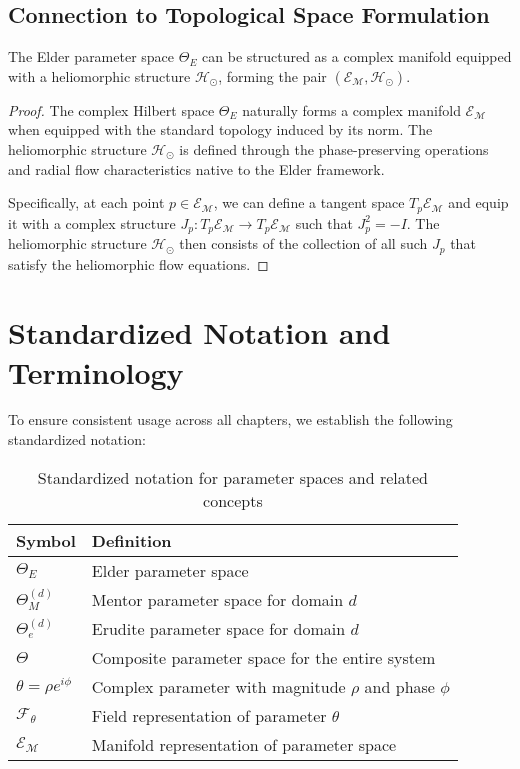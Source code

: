\subsection{Connection to Topological Space Formulation}

\begin{theorem}
The Elder parameter space $\Theta_E$ can be structured as a complex manifold equipped with a heliomorphic structure $\mathcal{H}_{\odot}$, forming the pair $(\mathcal{E}_{\mathcal{M}}, \mathcal{H}_{\odot})$.
\end{theorem}

\begin{proof}
The complex Hilbert space $\Theta_E$ naturally forms a complex manifold $\mathcal{E}_{\mathcal{M}}$ when equipped with the standard topology induced by its norm. The heliomorphic structure $\mathcal{H}_{\odot}$ is defined through the phase-preserving operations and radial flow characteristics native to the Elder framework.

Specifically, at each point $p \in \mathcal{E}_{\mathcal{M}}$, we can define a tangent space $T_p\mathcal{E}_{\mathcal{M}}$ and equip it with a complex structure $J_p: T_p\mathcal{E}_{\mathcal{M}} \to T_p\mathcal{E}_{\mathcal{M}}$ such that $J_p^2 = -I$. The heliomorphic structure $\mathcal{H}_{\odot}$ then consists of the collection of all such $J_p$ that satisfy the heliomorphic flow equations.
\end{proof}

\section{Standardized Notation and Terminology}

To ensure consistent usage across all chapters, we establish the following standardized notation:

\begin{table}[h]
\centering
\begin{tabular}{|l|l|}
\hline
\textbf{Symbol} & \textbf{Definition} \\
\hline
$\Theta_E$ & Elder parameter space \\
$\Theta_M^{(d)}$ & Mentor parameter space for domain $d$ \\
$\Theta_e^{(d)}$ & Erudite parameter space for domain $d$ \\
$\Theta$ & Composite parameter space for the entire system \\
$\theta = \rho e^{i\phi}$ & Complex parameter with magnitude $\rho$ and phase $\phi$ \\
$\mathcal{F}_{\theta}$ & Field representation of parameter $\theta$ \\
$\mathcal{E}_{\mathcal{M}}$ & Manifold representation of parameter space \\
\hline
\end{tabular}
\caption{Standardized notation for parameter spaces and related concepts}
\end{table}

